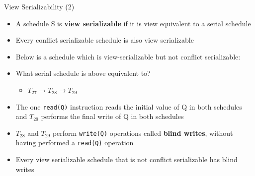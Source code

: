 \documentclass[aspectratio=169, xcolor=dvipsnames]{beamer}
\begin{document}
\begin{frame}{View Serializability (2)}
    \begin{itemize}[<+->]
        \item A schedule S is \textbf{view serializable} if it is view equivalent to a serial schedule
        \item Every conflict serializable schedule is also view serializable
        \item Below is a schedule which is view-serializable but not conflict serializable:
    \end{itemize}
    \begin{itemize}[<+->]
        \item What serial schedule is above equivalent to?
        \begin{itemize}
            \item[$\triangleright$] $T_{27} \rightarrow T_{28} \rightarrow T_{29}$
        \end{itemize}
        \item The one \texttt{read(Q)} instruction reads the initial value of Q in both schedules and $T_{29}$ performs the final write of Q in both schedules
        \item $T_{28}$ and $T_{29}$ perform \texttt{write(Q)} operations called \textbf{blind writes}, without having performed a \texttt{read(Q)} operation
        \item Every view serializable schedule that is not conflict serializable has blind writes
    \end{itemize}
\end{frame}
\end{document}
